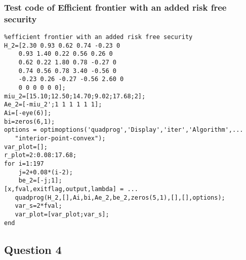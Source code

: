 \subsubsection{\bfseries Test code of Efficient frontier with an added risk free security}
\label{6.3.4}
{\setmainfont{Courier New Bold} \scriptsize         
\begin{lstlisting}
%efficient frontier with an added risk free security
H_2=[2.30 0.93 0.62 0.74 -0.23 0
    0.93 1.40 0.22 0.56 0.26 0
    0.62 0.22 1.80 0.78 -0.27 0
    0.74 0.56 0.78 3.40 -0.56 0
    -0.23 0.26 -0.27 -0.56 2.60 0
    0 0 0 0 0 0];
miu_2=[15.10;12.50;14.70;9.02;17.68;2];
Ae_2=[-miu_2';1 1 1 1 1 1];
Ai=[-eye(6)];
bi=zeros(6,1);
options = optimoptions('quadprog','Display','iter','Algorithm',...
   "interior-point-convex");
var_plot=[];
r_plot=2:0.08:17.68;
for i=1:197
    j=2+0.08*(i-2);
    be_2=[-j;1];
[x,fval,exitflag,output,lambda] = ...
   quadprog(H_2,[],Ai,bi,Ae_2,be_2,zeros(5,1),[],[],options);
   var_s=2*fval;
   var_plot=[var_plot;var_s];
end
\end{lstlisting}}


\subsection{\bfseries Question 4 }
